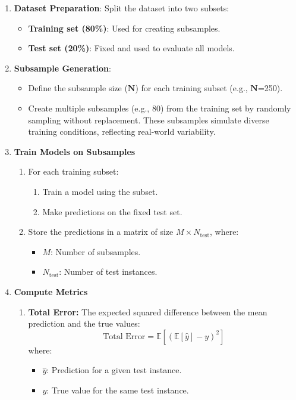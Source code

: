 \documentclass[a4paper,10pt]{article}
\begin{document}
\begin{enumerate}
    \item \textbf{Dataset Preparation}: Split the dataset into two subsets: 
    \begin{itemize}
        \item \textbf{Training set (80\%)}: Used for creating subsamples.
        \item \textbf{Test set (20\%)}: Fixed and used to evaluate all models.
    \end{itemize}

    \item \textbf{Subsample Generation}: 
    \begin{itemize}
        \item Define the subsample size ($\mathbf{N}$) for each training subset (e.g., $\mathbf{N}$=250).
        \item Create multiple subsamples (e.g., 80) from the training set by randomly sampling without replacement. These subsamples simulate diverse training conditions, reflecting real-world variability.
    \end{itemize}

    \item \textbf{Train Models on Subsamples}
    \begin{enumerate}
        \item For each training subset:
        \begin{enumerate}
            \item Train a model using the subset.
            \item Make predictions on the fixed test set.
        \end{enumerate}
        \item Store the predictions in a matrix of size \(M \times N_{\text{test}}\), where:
        \begin{itemize}
            \item \(M\): Number of subsamples.
            \item \(N_{\text{test}}\): Number of test instances.
        \end{itemize}
    \end{enumerate}

   \item \textbf{Compute Metrics}
\begin{enumerate}
    \item \textbf{Total Error:} The expected squared difference between the mean prediction and the true values:
    \[
    \text{Total Error} = \mathbb{E}\left[(\mathbb{E}[\hat{y}] - y)^2\right]
    \]
    where:
    \begin{itemize}
        \item \(\hat{y}\): Prediction for a given test instance.
        \item \(y\): True value for the same test instance.
    \end{itemize}


\end{enumerate}
\end{enumerate}
\end{document}
